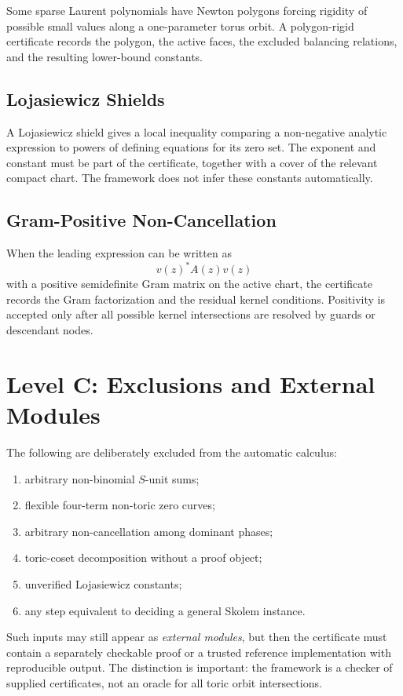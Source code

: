 \documentclass[11pt]{article}
\begin{document}
Some sparse Laurent polynomials have Newton polygons forcing rigidity of possible small values along a one-parameter torus orbit. A polygon-rigid certificate records the polygon, the active faces, the excluded balancing relations, and the resulting lower-bound constants.

\subsection{Lojasiewicz Shields}

A Lojasiewicz shield gives a local inequality comparing a non-negative analytic expression to powers of defining equations for its zero set. The exponent and constant must be part of the certificate, together with a cover of the relevant compact chart. The framework does not infer these constants automatically.

\subsection{Gram-Positive Non-Cancellation}

When the leading expression can be written as
\[
v(z)^*A(z)v(z)
\]
with a positive semidefinite Gram matrix on the active chart, the certificate records the Gram factorization and the residual kernel conditions. Positivity is accepted only after all possible kernel intersections are resolved by guards or descendant nodes.

\section{Level C: Exclusions and External Modules}

The following are deliberately excluded from the automatic calculus:
\begin{enumerate}[label=(\roman*)]
\item arbitrary non-binomial \(S\)-unit sums;
\item flexible four-term non-toric zero curves;
\item arbitrary non-cancellation among dominant phases;
\item toric-coset decomposition without a proof object;
\item unverified Lojasiewicz constants;
\item any step equivalent to deciding a general Skolem instance.
\end{enumerate}

Such inputs may still appear as \emph{external modules}, but then the certificate must contain a separately checkable proof or a trusted reference implementation with reproducible output. The distinction is important: the framework is a checker of supplied certificates, not an oracle for all toric orbit intersections.
\end{document}

